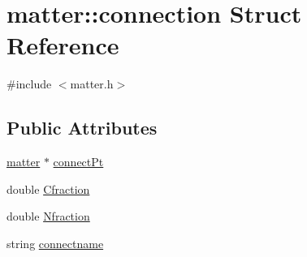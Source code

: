 \hypertarget{structmatter_1_1connection}{
\section{matter::connection Struct Reference}
\label{structmatter_1_1connection}
}


{\ttfamily \#include $<$matter.h$>$}\subsection*{Public Attributes}
\begin{DoxyCompactItemize}
\item 
\hyperlink{classmatter}{matter} $\ast$ \hyperlink{structmatter_1_1connection_a051ef090b207f84e7d354b5b9dc6e8eb}{connectPt}
\item 
double \hyperlink{structmatter_1_1connection_a1bc64491a187685ab647a630af24f756}{Cfraction}
\item 
double \hyperlink{structmatter_1_1connection_ab9854a021ba6fdecc57b6f5b2cf30db0}{Nfraction}
\item 
string \hyperlink{structmatter_1_1connection_a202dce22f8d21ab024b94df27a795c29}{connectname}
\end{DoxyCompactItemize}


